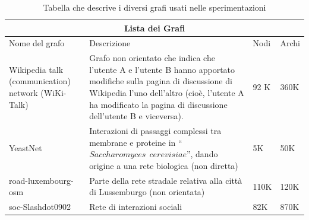 \begin{table}
	\begin{tabular}{|p{3cm}|p{7cm}|p{2cm}|p{2cm}| }
		 \hline
		\multicolumn{4}{|c|}{Lista dei Grafi} \\
		\hline
		Nome del grafo & Descrizione & Nodi & Archi\\
		\hline
		\hline
		Wikipedia talk (communication) network (WiKi-Talk) \cite{leskovec2010predicting} & Grafo non orientato che indica che l'utente A e l'utente B hanno apportato modifiche sulla pagina di discussione di Wikipedia l'uno dell'altro (cioè, l'utente A ha modificato la pagina di discussione dell'utente B e viceversa). & 92 K & 360K\\
		\hline
	YeastNet \cite{babu2012interaction} & Interazioni di passaggi complessi tra membrane e proteine in ``$ Saccharomyces \ \ cerevisiae $'', dando origine a una rete biologica (non diretta) & 5K & 50K\\
		\hline
		 road-luxembourg-osm \cite{bader2013graph} & Parte della rete stradale relativa alla città di Lussemburgo (non orientata) & 110K & 120K\\
		 \hline
		 soc-Slashdot0902 \cite{leskovec2009community} & Rete di interazioni sociali & 82K & 870K \\ 
		 \hline
	\end{tabular}
\caption{Tabella che descrive i diversi grafi usati nelle sperimentazioni}
\label{Tabella:grafo}
\end{table}

